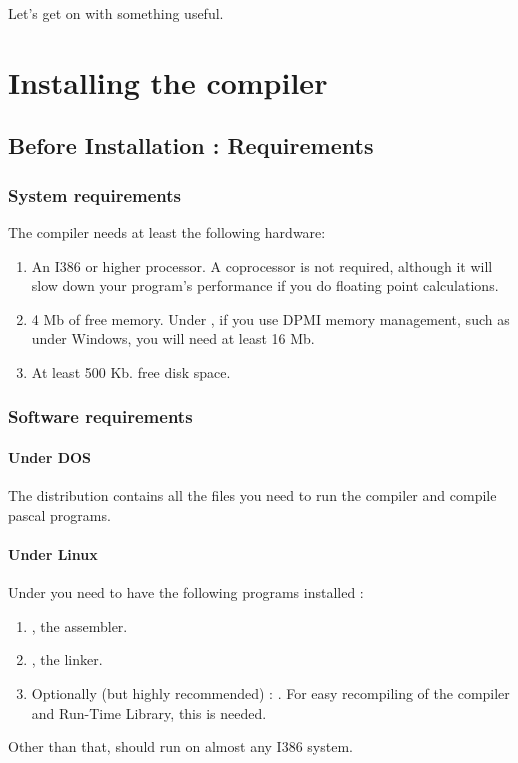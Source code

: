 \documentclass{book}
\begin{document}
Let's get on with something useful.


\chapter{Installing the compiler}
\label{ch:Installation}

\section{Before Installation : Requirements}

%
%
\subsection{System requirements}
The compiler needs at least the following hardware:
\begin{enumerate}
\item An I386 or higher processor. A coprocessor is not required, although it
will slow down your program's performance if you do floating point calculations.
\item 4 Mb of free memory. Under \dos, if you use DPMI memory management,
such as under Windows, you will need at least 16 Mb.
\item At least 500 Kb. free disk space.
\end{enumerate}

\subsection{Software requirements}

\subsubsection{Under DOS}
The \dos distribution contains all the files you need to run the compiler
and compile pascal programs.

\subsubsection{Under Linux}
Under \linux you need to have the following programs installed :
\begin{enumerate}
\item \gnu {}, the \gnu assembler.
\item \gnu {}, the \gnu linker.
\item Optionally (but highly recommended) : \gnu {}. For easy
recompiling of the compiler and Run-Time Library, this is needed.
\end{enumerate}
Other than that, \fpc should run on almost any I386 \linux system.
\end{document}
